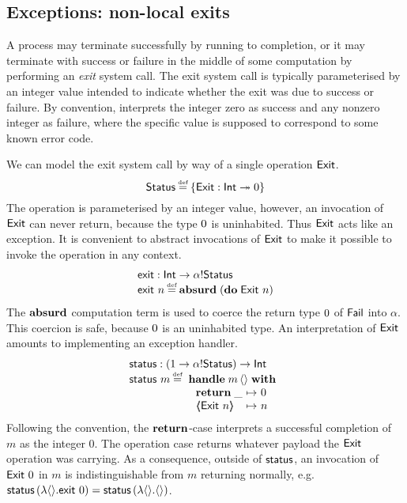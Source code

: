 \documentclass[12pt,phd,lfcs,twoside,openright,logo,leftchapter,normalheadings]{infthesis}
\theoremstyle{plain}
\theoremstyle{definition}
\begin{document}
\subsection{Exceptions: non-local exits}
\label{sec:tiny-unix-exit}

A process may terminate successfully by running to completion, or it
may terminate with success or failure in the middle of some
computation by performing an \emph{exit} system call. The exit system
call is typically parameterised by an integer value intended to
indicate whether the exit was due to success or failure. By
convention, \UNIX{} interprets the integer zero as success and any
nonzero integer as failure, where the specific value is supposed to
correspond to some known error code.
%

We can model the exit system call by way of a single operation
$\mathsf{Exit}$.
%
\[
  \Status \defas \{\Exit : \Int \opto \ZeroType\}
\]
%
The operation is parameterised by an integer value, however, an
invocation of $\mathsf{Exit}$ can never return, because the type $0$ is
uninhabited. Thus $\mathsf{Exit}$ acts like an exception.
%
It is convenient to abstract invocations of $\mathsf{Exit}$ to make it
possible to invoke the operation in any context.
%
\[
  \bl
    \exit : \Int \to \alpha \eff \Status\\
    \exit~n \defas \Absurd\;(\Do\;\Exit~n)
  \el
\]
%
The $\mathbf{absurd}$ computation term is used to coerce the return type
$0$ of $\mathsf{Fail}$ into $\alpha$. This coercion is safe, because
$0$ is an uninhabited type.
%
An interpretation of $\mathsf{Exit}$ amounts to implementing an exception
handler.
%
\[
  \bl
    \status : (\UnitType \to \alpha \eff \Status) \to \Int\\
    \status~m \defas
       \ba[t]{@{~}l}
         \Handle\;m\,\Unit\;\With\\
           ~\ba{@{~}l@{~}c@{~}l}
              \Return\;\_ &\mapsto& 0\\
              \ExnCase{\Exit}{n} &\mapsto& n
           \ea
       \ea
  \el
\]
%
Following the \UNIX{} convention, the $\mathbf{return}$-case interprets a
successful completion of $m$ as the integer $0$. The operation case
returns whatever payload the $\mathsf{Exit}$ operation was carrying. As a
consequence, outside of $\mathsf{status}$, an invocation of $\mathsf{Exit}~0$ in $m$
is indistinguishable from $m$ returning normally, e.g.
$\mathsf{status}\,(\lambda\langle  \rangle.\mathsf{exit}~0) = \mathsf{status}\,(\lambda\langle  \rangle.\langle  \rangle)$.
\end{document}
